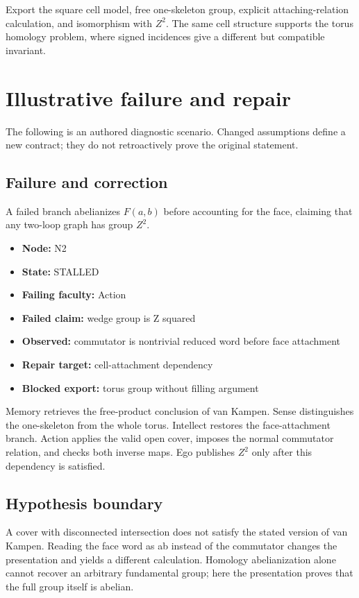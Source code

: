 \documentclass[preprint,12pt,aps,pra,showkeys,amsmath,amssymb,superscriptaddress,floatfix]{revtex4-2}
\theoremstyle{definition}
\theoremstyle{remark}
\begin{document}
Export the square cell model, free one-skeleton group, explicit
attaching-relation calculation, and isomorphism with \(Z^{2}\). The same
cell structure supports the torus homology problem, where signed
incidences give a different but compatible invariant.

\section{Illustrative failure and repair}

The following is an authored diagnostic scenario. Changed assumptions
define a new contract; they do not retroactively prove the original
statement.

\subsection{Failure and correction}
A failed branch abelianizes \(F(a,b)\) before accounting for the face,
claiming that any two-loop graph has group \(Z^{2}\).

\begin{itemize}
\item
  \textbf{Node:} N2
\item
  \textbf{State:} STALLED
\item
  \textbf{Failing faculty:} Action
\item
  \textbf{Failed claim:} wedge group is Z squared
\item
  \textbf{Observed:} commutator is nontrivial reduced word before face
  attachment
\item
  \textbf{Repair target:} cell-attachment dependency
\item
  \textbf{Blocked export:} torus group without filling argument
\end{itemize}

Memory retrieves the free-product conclusion of van Kampen. Sense
distinguishes the one-skeleton from the whole torus. Intellect restores
the face-attachment branch. Action applies the valid open cover, imposes
the normal commutator relation, and checks both inverse maps. Ego
publishes \(Z^{2}\) only after this dependency is satisfied.

\subsection{Hypothesis boundary}
A cover with disconnected intersection does not satisfy the stated
version of van Kampen. Reading the face word as ab instead of the
commutator changes the presentation and yields a different calculation.
Homology abelianization alone cannot recover an arbitrary fundamental
group; here the presentation proves that the full group itself is
abelian.
\end{document}
